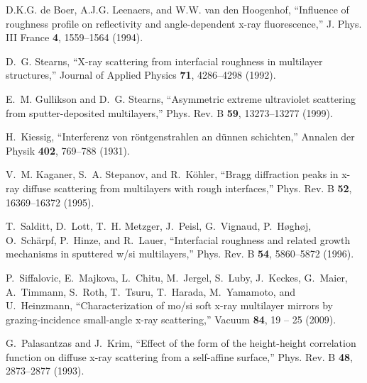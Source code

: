 \documentclass[twocolumn,osajnl,showpacs,superscriptaddress,11pt]{revtex4-1}
\begin{document}
\begin{thebibliography}{10}
{D.K.G. de Boer}, {A.J.G. Leenaers}, and {W.W. van den Hoogenhof},
  \enquote{Influence of roughness profile on reflectivity and angle-dependent
  x-ray fluorescence,} J. Phys. III France \textbf{4}, 1559--1564 (1994).

D.~G. Stearns, \enquote{X-ray scattering from interfacial roughness in
  multilayer structures,} Journal of Applied Physics \textbf{71}, 4286--4298
  (1992).

E.~M. Gullikson and D.~G. Stearns, \enquote{Asymmetric extreme ultraviolet
  scattering from sputter-deposited multilayers,} Phys. Rev. B \textbf{59},
  13273--13277 (1999).

H.~Kiessig, \enquote{Interferenz von r{\"o}ntgenstrahlen an d{\"u}nnen
  schichten,} Annalen der Physik \textbf{402}, 769--788 (1931).

V.~M. Kaganer, S.~A. Stepanov, and R.~K\"ohler, \enquote{Bragg diffraction
  peaks in x-ray diffuse scattering from multilayers with rough interfaces,}
  Phys. Rev. B \textbf{52}, 16369--16372 (1995).

T.~Salditt, D.~Lott, T.~H. Metzger, J.~Peisl, G.~Vignaud, P.~H{\o}gh{\o}j,
  O.~Sch\"arpf, P.~Hinze, and R.~Lauer, \enquote{Interfacial roughness and
  related growth mechanisms in sputtered w/si multilayers,} Phys. Rev. B
  \textbf{54}, 5860--5872 (1996).

P.~Siffalovic, E.~Majkova, L.~Chitu, M.~Jergel, S.~Luby, J.~Keckes, G.~Maier,
  A.~Timmann, S.~Roth, T.~Tsuru, T.~Harada, M.~Yamamoto, and U.~Heinzmann,
  \enquote{Characterization of mo/si soft x-ray multilayer mirrors by
  grazing-incidence small-angle x-ray scattering,} Vacuum \textbf{84}, 19 -- 25
  (2009).

G.~Palasantzas and J.~Krim, \enquote{Effect of the form of the height-height
  correlation function on diffuse x-ray scattering from a self-affine surface,}
  Phys. Rev. B \textbf{48}, 2873--2877 (1993).

\end{thebibliography}
\end{document}
